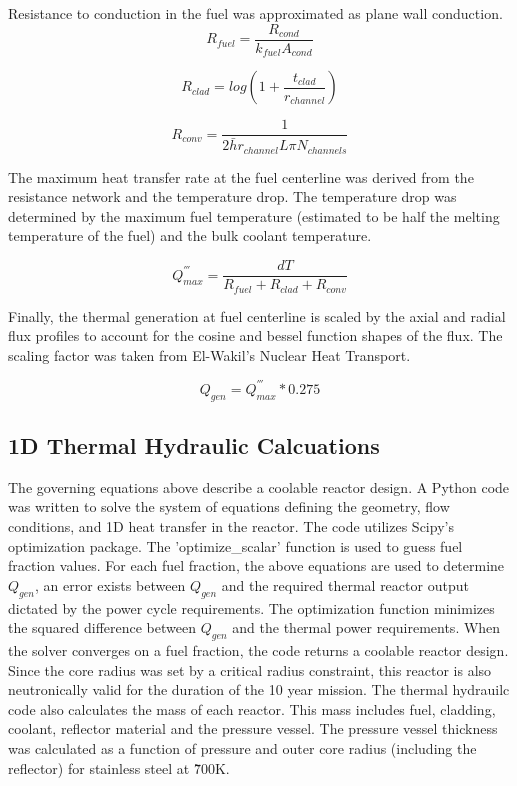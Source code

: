 Resistance to conduction in the fuel was approximated as plane wall conduction.
\begin{equation}
    R_{fuel} =  \frac{R_{cond}}{k_{fuel}A_{cond}}
\end{equation}

\begin{equation}
    R_{clad} = log(1+\frac{t_{clad}}{r_{channel}})
\end{equation}

\begin{equation}
    R_{conv} = \frac{1}{2\bar{h}r_{channel}L\pi N_{channels}}
\end{equation}

The maximum heat transfer rate at the fuel centerline was derived from the
resistance network and the temperature drop. The temperature drop was determined
by the maximum fuel temperature (estimated to be half the melting temperature of
the fuel) and the bulk coolant temperature.

\begin{equation}
    Q^{'''}_{max} = \frac{dT}{R_{fuel} + R_{clad} + R_{conv}}
\end{equation}

Finally, the thermal generation at fuel centerline is scaled by the axial and
radial flux profiles to account for the cosine and bessel function shapes of the
flux. The scaling factor was taken from El-Wakil's Nuclear Heat Transport.

\begin{equation}
    Q_{gen} = Q^{'''}_{max} * 0.275
\end{equation}

\subsection{1D Thermal Hydraulic Calcuations}

    The governing equations above describe a coolable
reactor design. A Python code was written to solve the system of equations
defining the geometry, flow conditions, and 1D heat transfer in the reactor. The
code utilizes Scipy's optimization package. The 'optimize\_scalar' function is
used to guess fuel fraction values. For each fuel fraction, the above equations
are used to determine $Q_{gen}$, an error exists between $Q_{gen}$ and the
required thermal reactor output dictated by the power cycle requirements. The
optimization function minimizes the squared difference between $Q_{gen}$ and the
thermal power requirements. When the solver converges on a fuel fraction, the
code returns a coolable reactor design. Since the core radius was set by a
critical radius constraint, this reactor is also neutronically valid for the
duration of the 10 year mission.
    The thermal hydrauilc code also calculates the mass of each reactor. This
mass includes fuel, cladding, coolant, reflector material and the pressure
vessel. The pressure vessel thickness was calculated as a function of pressure
and outer core radius (including the reflector) for stainless steel at \~700K.
